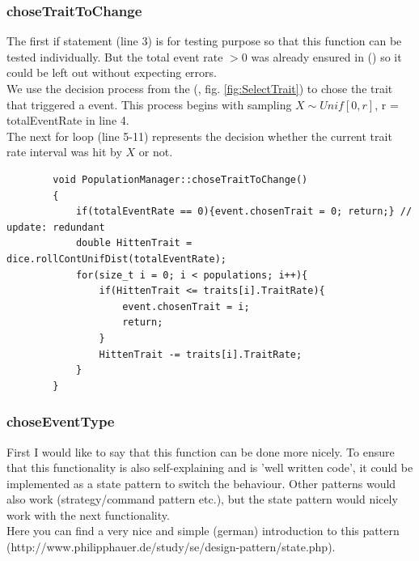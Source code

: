 \documentclass[a4paper,10pt]{scrartcl}
\begin{document}
		\subsubsection{choseTraitToChange} \label{subsubsec:choseTrait}
		The first if statement (line 3) is for testing purpose so that this function can be tested individually. But the total event rate $ > 0 $ was already ensured in () so it could be left out without expecting errors.\\
		We use the decision process from the (, fig. \ref{fig:SelectTrait}) to chose the trait that triggered a event. This process begins with sampling $ X \sim Unif[0,r] $, r = totalEventRate in line 4.\\
		The next for loop (line 5-11) represents the decision whether the current trait rate interval was hit by $ X $ or not.
		\begin{lstlisting} 
		void PopulationManager::choseTraitToChange()
		{
		    if(totalEventRate == 0){event.chosenTrait = 0; return;} // update: redundant
		    double HittenTrait = dice.rollContUnifDist(totalEventRate);
		    for(size_t i = 0; i < populations; i++){
		        if(HittenTrait <= traits[i].TraitRate){
		            event.chosenTrait = i;
		            return;
		        }
		        HittenTrait -= traits[i].TraitRate;
		    }
		}
		\end{lstlisting}

		\subsubsection{choseEventType} \label{subsubsec:choseEvent}
		First I would like to say that this function can be done more nicely. To ensure that this functionality is also self-explaining and is 'well written code', it could be implemented as a state pattern to switch the behaviour. Other patterns would also work (strategy/command pattern etc.), but the state pattern would nicely work with the next functionality. \\
		Here you can find a very nice and simple (german) introduction to this pattern (http://www.philipphauer.de/study/se/design-pattern/state.php).\\
		
\end{document}
